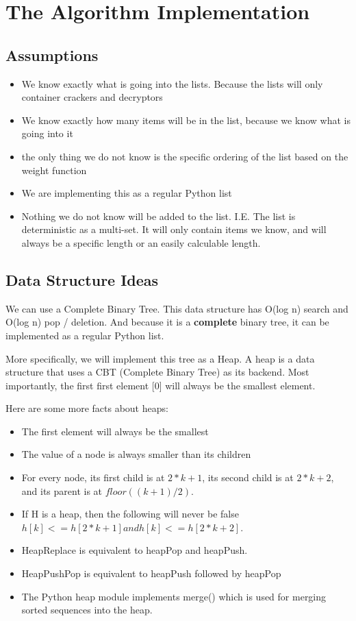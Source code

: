 \documentclass{article}
\theoremstyle{definition}
\begin{document}
\section{The Algorithm Implementation}

\subsection{Assumptions}

\begin{itemize}
\item We know exactly what is going into the lists. Because the lists will only container crackers and decryptors
\item We know exactly how many items will be in the list, because we know what is going into it
\item the only thing we do not know is the specific ordering of the list based on the weight function
\item We are implementing this as a regular Python list
\item Nothing we do not know will be added to the list. I.E. The list is deterministic as a multi-set. It will only contain items we know, and will always be a specific length or an easily calculable length.
\end{itemize}

\subsection{Data Structure Ideas}
We can use a Complete Binary Tree. This data structure has O(log n) search and O(log n) pop / deletion. And because it is a \textbf{complete} binary tree, it can be implemented as a regular Python list.

More specifically, we will implement this tree as a Heap. A heap is a data structure that uses a CBT (Complete Binary Tree) as its backend. Most importantly, the first first element [0] will always be the smallest element.

Here are some more facts about heaps:
\begin{itemize}
	\item The first element will always be the smallest
	\item The value of a node is always smaller than its children
	\item For every node, its first child is at $2*k + 1$, its second child is at $2*k + 2$, and its parent is at $floor((k + 1) / 2)$.
	\item If H is a heap, then the following will never be false $
h[k] <= h[2*k + 1] and h[k] <= h[2*k + 2]$. 
\item HeapReplace is equivalent to heapPop and heapPush. 
\item HeapPushPop is equivalent to heapPush followed by heapPop
\item The Python heap module implements merge() which is used for merging sorted sequences into the heap.
\end{itemize}
\end{document}
